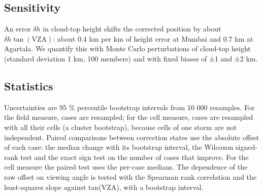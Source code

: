 \subsection{Sensitivity}\label{sec:4.6}

An error \(\delta h\) in cloud-top height shifts the corrected position by about \(\delta h\tan(\mathrm{VZA})\): about 0.4 km per km of height error at Mumbai and 0.7 km at Agartala. We quantify this with Monte Carlo perturbations of cloud-top height (standard deviation 1 km, 100 members) and with fixed biases of ±1 and ±2 km.

\subsection{Statistics}\label{sec:4.7}

Uncertainties are 95 \% percentile bootstrap intervals from 10 000 resamples. For the field measure, cases are resampled; for the cell measure, cases are resampled with all their cells (a cluster bootstrap), because cells of one storm are not independent. Paired comparisons between correction states use the absolute offset of each case: the median change with its bootstrap interval, the Wilcoxon signed-rank test and the exact sign test on the number of cases that improve. For the cell measure the paired test uses the per-case medians. The dependence of the raw offset on viewing angle is tested with the Spearman rank correlation and the least-squares slope against tan(VZA), with a bootstrap interval.
